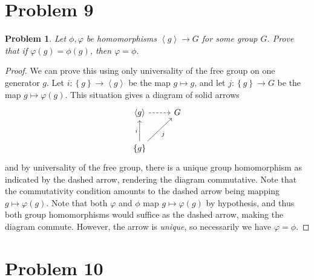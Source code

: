 \documentclass[11pt, letterpaper]{article}
\theoremstyle{plain}
\newtheorem{problem}{Problem}[section]
\begin{document}
\section{Problem 9}

\begin{problem}
	Let $\phi ,\varphi $ be homomorphisms $\left\langle g \right\rangle \to G$ for some group $G$. Prove that if $\varphi (g)=\phi (g)$, then $\varphi =\phi $.
\end{problem}
\begin{proof}
	We can prove this using only universality of the free group on one generator $g$. Let $i : \left\{ g \right\}  \to \left\langle g \right\rangle $ be the map $g\mapsto g$, and let $j : \left\{ g \right\}  \to G$ be the map $g\mapsto \varphi (g)$. This situation gives a diagram of solid arrows
	\[\begin{tikzcd}[row sep = 2.5em, column sep = 2.5em]
	\left\langle g \right\rangle \ar[dashed, r]  & G \\
	\left\{ g \right\} \ar[" i ", u] \ar[" j "', ur]  & 
	\end{tikzcd}\]
	and by universality of the free group, there is a unique group homomorphism as indicated by the dashed arrow, rendering the diagram commutative. Note that the commutativity condition amounts to the dashed arrow being mapping $g\mapsto \varphi (g)$. Note that both $\varphi $ and $\phi $ map $g\mapsto \varphi (g)$ by hypothesis, and thus both group homomorphisms would suffice as the dashed arrow, making the diagram commute. However, the arrow is \emph{unique}, so necessarily we have $\varphi =\phi $.
\end{proof}


\section{Problem 10}
\end{document}
